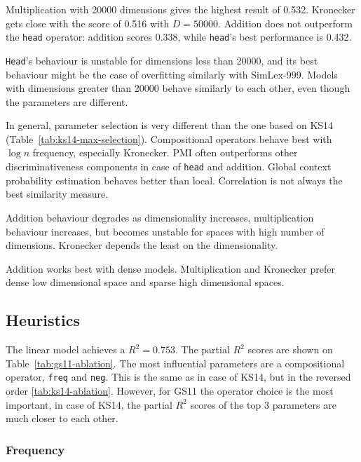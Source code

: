 Multiplication with 20000 dimensions gives the highest result of 0.532. Kronecker gets close with the score of 0.516 with $D = 50000$. Addition does not outperform the \texttt{head} operator: addition scores 0.338, while \texttt{head}'s best performance is 0.432.

\texttt{Head}'s behaviour is unstable for dimensions less than 20000, and its best behaviour might be the case of overfitting similarly with SimLex-999. Models with dimensions greater than 20000 behave similarly to each other, even though the parameters are different.

In general, parameter selection is very different than the one based on KS14 (Table~\ref{tab:ks14-max-selection}). Compositional operators behave best with $\log n$ frequency, especially Kronecker. PMI often outperforms other discriminativeness components in case of \texttt{head} and addition. Global context probability estimation behaves better than local. Correlation is not always the best similarity measure.

Addition behaviour degrades as dimensionality increases, multiplication behaviour increases, but becomes unstable for spaces with high number of dimensions. Kronecker depends the least on the dimensionality.

Addition works best with dense models. Multiplication and Kronecker prefer dense low dimensional space and sparse high dimensional spaces.


\subsection{Heuristics}
\label{sec:heuristics-gs11}

The linear model achieves a $R^2 = 0.753$. The partial $R^2$ scores are shown on Table~\ref{tab:gs11-ablation}. The most influential parameters are a compositional operator, \texttt{freq} and \texttt{neg}. This is the same as in case of KS14, but in the reversed order \ref{tab:ks14-ablation}. However, for GS11 the operator choice is the most important, in case of KS14, the partial $R^2$ scores of the top 3 parameters are much closer to each other.



\subsubsection{Frequency}



